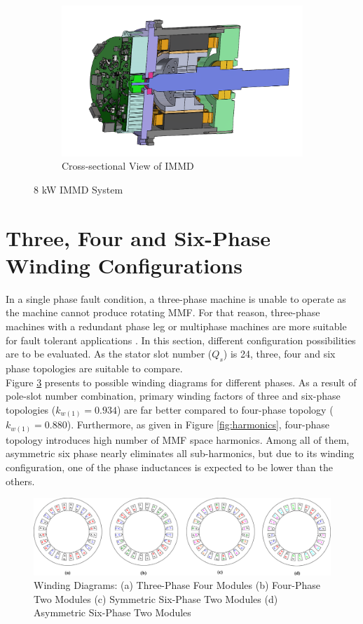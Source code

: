 \documentclass[a4paper,11pt]{article}
\begin{document}
\begin{figure}[ht!]
\begin{subfigure}[b]{0.33\textwidth}
    \centering
    \includegraphics[width=\linewidth]{immd_csview.PNG}
    \caption{Cross-sectional View of IMMD}
    \label{fig:as6phmmf}    
\end{subfigure}
 \caption{8 kW IMMD System}
\end{figure}


\section{\normalsize\textbf{Three, Four and Six-Phase Winding Configurations}}
In a single phase fault condition, a three-phase machine is unable to operate as the machine cannot produce rotating MMF. For that reason, three-phase machines with a redundant phase leg or multiphase machines are more suitable for fault tolerant applications \cite{phaseleg}.
In this section, different configuration possibilities are to be evaluated. As the stator slot number ($Q_s$) is 24, three, four and six phase topologies are suitable to compare.\\

Figure \ref{fig:winding} presents to possible winding diagrams for different phases. As a result of pole-slot number combination, primary winding factors of three and six-phase topologies ($k_{w(1)} = 0.934$) are far better compared to four-phase topology ($k_{w(1)} = 0.880$). Furthermore, as given in Figure \ref{fig:harmonics}, four-phase topology introduces high number of MMF space harmonics. Among all of them, asymmetric six phase nearly eliminates all sub-harmonics, but due to its winding configuration, one of the phase inductances is expected to be lower than the others.

\begin{figure}[ht!]
    \centering
    \includegraphics{windings.png}
    \caption{Winding Diagrams: (a) Three-Phase Four Modules (b) Four-Phase Two Modules (c) Symmetric Six-Phase Two Modules (d) Asymmetric Six-Phase Two Modules  }
    \label{fig:winding}
\end{figure}
\end{document}
